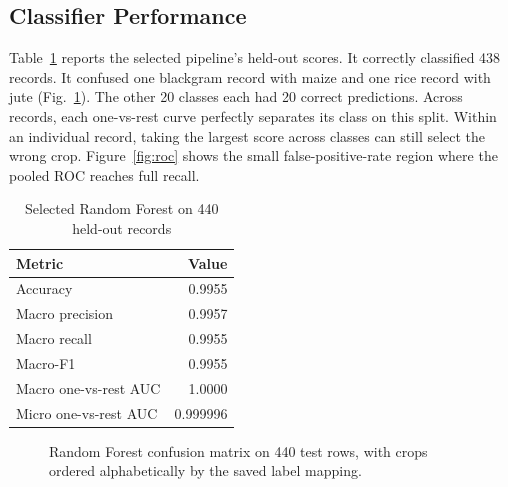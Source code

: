 \documentclass[conference]{IEEEtran}
\begin{document}
\subsection{Classifier Performance}
Table~\ref{tab:official} reports the selected pipeline's held-out scores. It correctly classified 438 records. It confused one blackgram record with maize and one rice record with jute (Fig.~\ref{fig:cm}). The other 20 classes each had 20 correct predictions. Across records, each one-vs-rest curve perfectly separates its class on this split. Within an individual record, taking the largest score across classes can still select the wrong crop. Figure~\ref{fig:roc} shows the small false-positive-rate region where the pooled ROC reaches full recall.

\begin{table}[t]
\caption{Selected Random Forest on 440 held-out records}
\label{tab:official}
\centering\scriptsize
\begin{tabular}{@{}lr@{}}
\toprule
Metric & Value \\
\midrule
Accuracy & 0.9955 \\
Macro precision & 0.9957 \\
Macro recall & 0.9955 \\
Macro-F1 & 0.9955 \\
Macro one-vs-rest AUC & 1.0000 \\
Micro one-vs-rest AUC & 0.999996 \\
\bottomrule
\end{tabular}
\end{table}

\begin{figure}[t]
\centering
{}
\caption{Random Forest confusion matrix on 440 test rows, with crops ordered alphabetically by the saved label mapping.}
\label{fig:cm}
\end{figure}
\end{document}

